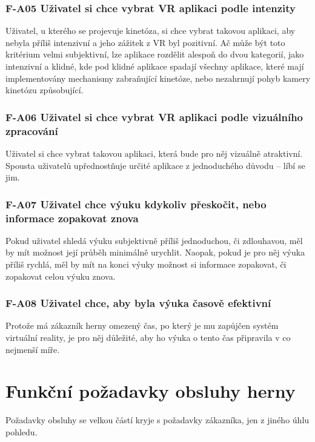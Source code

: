 \subsubsection*{F-A05 Uživatel si chce vybrat VR aplikaci podle intenzity}
Uživatel, u kterého se projevuje kinetóza, si chce vybrat takovou
aplikaci, aby nebyla příliš intenzivní a jeho zážitek z VR byl
pozitivní. Ač může být toto kritérium velmi subjektivní, lze aplikace
rozdělit alespoň do dvou kategorií, jako intenzivní a klidné, kde pod
klidné aplikace spadají všechny aplikace, které mají implementovány
mechanismy zabraňující kinetóze, nebo nezahrnují pohyb kamery kinetózu
způsobující.

\subsubsection*{F-A06 Uživatel si chce vybrat VR aplikaci podle vizuálního
zpracování}
Uživatel si chce vybrat takovou aplikaci, která bude pro něj vizuálně
atraktivní. Spousta uživatelů upřednostňuje určité aplikace z
jednoduchého důvodu -- líbí se jim.

\subsubsection*{F-A07 Uživatel chce výuku kdykoliv přeskočit, nebo informace
zopakovat znova} 
Pokud uživatel shledá výuku subjektivně příliš
jednoduchou, či zdlouhavou, měl by mít možnost její průběh minimálně
urychlit. Naopak, pokud je pro něj výuka příliš rychlá, měl by mít na
konci výuky možnost si informace zopakovat, či zopakovat celou výuku
znova.

\subsubsection*{F-A08 Uživatel chce, aby byla výuka časově efektivní}
Protože má zákazník herny omezený čas, po který je mu zapůjčen systém
virtuální reality, je pro něj důležité, aby ho výuka o tento čas
připravila v co nejmenší míře.

\newpage

\section{Funkční požadavky obsluhy
herny}\label{funkux10dnuxed-poux17eadavky-obsluhy-herny}

Požadavky obsluhy se velkou částí kryje s požadavky zákazníka, jen z
jiného úhlu pohledu.

